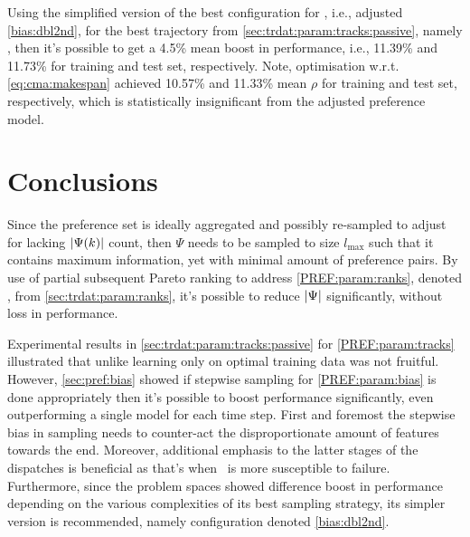 
Using the simplified version of the best configuration for , 
i.e., adjusted \ref{bias:dbl2nd}, for the best  trajectory from  
\cref{sec:trdat:param:tracks:passive}, namely , then it's 
possible to get a 4.5\% mean boost in performance, i.e., 11.39\% and 11.73\% 
for training and test set, respectively. 
Note, optimisation w.r.t. \cref{eq:cma:makespan} achieved 10.57\% 
and 11.33\% mean $\rho$ for training and test set, respectively, which is 
statistically insignificant from the adjusted preference model.

\section{Conclusions}
Since the preference set is ideally aggregated and possibly re-sampled 
to adjust for lacking $\lvert\Psi(k)\rvert$ count, then $\Psi$ needs to be sampled to 
size $l_{\max}$ such that it contains maximum information, yet with minimal 
amount of preference pairs. 
By use of partial subsequent Pareto ranking to address \ref{PREF:param:ranks}, 
denoted , from \cref{sec:trdat:param:ranks}, it's possible to reduce 
$\lvert\Psi\rvert$ significantly, without loss in performance. 

Experimental results in \cref{sec:trdat:param:tracks:passive} for 
\ref{PREF:param:tracks} illustrated that unlike 
\citet{Siggi10,Malik08,Russell09} learning only on optimal training data was 
not fruitful. 
However, \cref{sec:pref:bias} showed if stepwise sampling for 
\ref{PREF:param:bias} is done appropriately then it's possible to boost 
performance significantly, even outperforming a single model for each time step.
First and foremost the stepwise bias in sampling needs to counter-act the 
disproportionate amount of features towards the end. 
Moreover, additional emphasis to the latter stages of the dispatches is 
beneficial as that's when \JSP\ is more susceptible to failure. 
Furthermore, since the problem spaces showed difference boost in performance 
depending on the various complexities of its best sampling strategy, its 
simpler version is recommended, namely configuration denoted \ref{bias:dbl2nd}.

